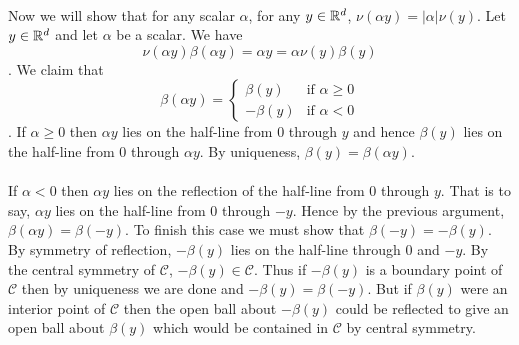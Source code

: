 \documentclass[letterpaper,12pt,oneside,onecolumn]{article}
\newcommand{\cC}{\mathcal{C}} \newcommand{\cD}{\mathcal{D}}
\begin{document}
\paragraph{}
Now we will show that for any scalar $\alpha$, for any $y \in \mathbb{R}^d$, $\nu(\alpha y) = |\alpha| \nu(y)$. Let $y \in \mathbb{R}^d$ and let $\alpha$ be a scalar. We have
\begin{equation}
\nu(\alpha y) \beta(\alpha y) = \alpha y = \alpha \nu(y) \beta(y) \label{eq:nudef}
\end{equation}
. We claim that \begin{equation} \beta(\alpha y) = \begin{cases} \beta(y) &\text{if $\alpha \geq 0$} \\
-\beta(y) &\text{if $\alpha <0$}\end{cases}\label{eq:betacases}\end{equation}
. If $\alpha \geq 0$ then $\alpha y$ lies on the half-line from $0$ through $y$ and hence $\beta(y)$ lies on the half-line from $0$ through $\alpha y$. By uniqueness, $\beta(y) = \beta(\alpha y)$.
\paragraph{}
If $\alpha < 0$ then $\alpha y$ lies on the reflection of the half-line from $0$ through $y$. That is to say, $\alpha y$ lies on the half-line from $0$ through $-y$. Hence by the previous argument, $\beta(\alpha y) = \beta(-y)$. To finish this case we must show that $\beta(-y) = -\beta(y)$. By symmetry of reflection, $-\beta(y)$ lies on the half-line through $0$ and $-y$. By the central symmetry of $\cC$, $-\beta(y) \in \cC$. Thus if $-\beta(y)$ is a boundary point of $\cC$ then by uniqueness we are done and $-\beta(y) = \beta(-y)$. But if $\beta(y)$ were an interior point of $\cC$ then the open ball about $-\beta(y)$ could be reflected to give an open ball about $\beta(y)$ which would be contained in $\cC$ by central symmetry.
\end{document}
